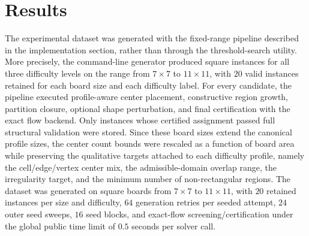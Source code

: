 \section{Results}

The experimental dataset was generated with the fixed-range pipeline described
in the implementation section, rather than through the threshold-search
utility. More precisely, the command-line generator produced square instances
for all three difficulty levels on the range from \(7\times 7\) to
\(11\times 11\), with \(20\) valid instances retained for each board size and
each difficulty label. For every candidate, the pipeline executed profile-aware
center placement, constructive region growth, partition closure, optional shape
perturbation, and final certification with the exact flow backend. Only
instances whose certified assignment passed full structural validation were
stored. Since these board sizes extend the canonical profile sizes, the center
count bounds were rescaled as a function of board area while preserving the
qualitative targets attached to each difficulty profile, namely the
cell/edge/vertex center mix, the admissible-domain overlap range, the
irregularity target, and the minimum number of non-rectangular regions. The
dataset was generated on square boards from \(7\times 7\) to \(11\times 11\),
with \(20\) retained instances per size and difficulty, \(64\) generation
retries per seeded attempt, \(24\) outer seed sweeps, \(16\) seed blocks, and
exact-flow screening/certification under the global public time limit of
\(0.5\) seconds per solver call.

\begin{table}[t]
\caption{Dataset-generation parameters used in the experimental campaign.}
\label{tab:dataset_generation_parameters}
\centering
\scriptsize
\setlength{\tabcolsep}{2.6pt}
\renewcommand{\arraystretch}{1.05}
\end{table}

